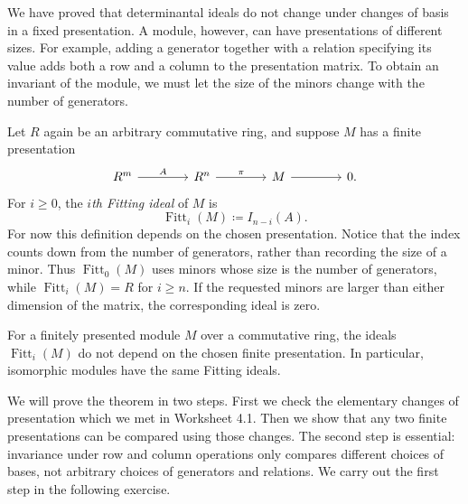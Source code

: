\documentclass[12pt,reqno]{amsart}
\DeclareMathOperator{\Fitt}{Fitt}
\begin{document}
\hrulefill

We have proved that determinantal ideals do not change under changes of basis in a fixed presentation. A module, however, can have presentations of different sizes. For example, adding a generator together with a relation specifying its value adds both a row and a column to the presentation matrix. To obtain an invariant of the module, we must let the size of the minors change with the number of generators.

Let $R$ again be an arbitrary commutative ring, and suppose $M$ has a finite presentation
\[
\begin{tikzcd}[column sep=4em]
R^m \arrow[r,"A"] & R^n \arrow[r,"\pi"] & M \arrow[r] & 0.
\end{tikzcd}
\]
For $i\geq0$, the \emph{$i$th Fitting ideal} of $M$ is
\[
\Fitt_i(M)\coloneqq I_{n-i}(A).
\]
For now this definition depends on the chosen presentation. Notice that the index counts down from the number of generators, rather than recording the size of a minor. Thus $\Fitt_0(M)$ uses minors whose size is the number of generators, while $\Fitt_i(M)=R$ for $i\geq n$. If the requested minors are larger than either dimension of the matrix, the corresponding ideal is zero.

\begin{theorem}
For a finitely presented module $M$ over a commutative ring, the ideals $\Fitt_i(M)$ do not depend on the chosen finite presentation. In particular, isomorphic modules have the same Fitting ideals.
\end{theorem}

We will prove the theorem in two steps. First we check the elementary changes of presentation which we met in Worksheet 4.1. Then we show that any two finite presentations can be compared using those changes. The second step is essential: invariance under row and column operations only compares different choices of bases, not arbitrary choices of generators and relations. We carry out the first step in the following exercise.

\hrulefill
\end{document}
